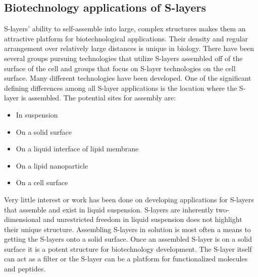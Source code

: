   \subsection{Biotechnology applications of S-layers}\label{sec:biot-appl-s}
  
  \Acp{S-layer}' ability to self-assemble into large, complex structures makes them an attractive platform for biotechnological applications. Their density and regular arrangement
over relatively large distances is unique in biology. There have been several groups pursuing technologies that utilize \acp{S-layer} assembled off of the surface of the cell and
groups that focus on \ac{S-layer} technologies on the cell surface. Many different technologies have been developed. One of the significant defining differences among all
\ac{S-layer} applications is the location where the \ac{S-layer} is assembled. The potential sites for assembly are:
  \begin{itemize}
  \item In suspension
  \item On a solid surface
  \item On a liquid interface of lipid membrane
  \item On a lipid nanoparticle
  \item On a cell surface
  \end{itemize} %

  Very little interest or work has been done on developing applications for \acp{S-layer} that assemble and exist in liquid suspension. \Acp{S-layer} are inherently two-dimensional
and unrestricted freedom in liquid suspension does not highlight their unique structure. Assembling \acp{S-layer} in solution is most often a means to getting the \acp{S-layer}
onto a solid surface. Once an assembled \ac{S-layer} is on a solid surface it is
a potent structure for biotechnology development. The \ac{S-layer} itself can act as a filter or the
\ac{S-layer} can be a platform for functionalized molecules and peptides.

